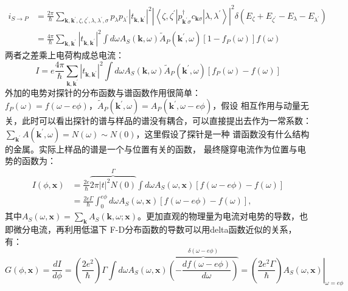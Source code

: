 \documentclass[10pt,openany]{book}
\theoremstyle{thmstyle} %
\theoremstyle{defstyle} %
\theoremstyle{prostyle} %
\begin{document}
\begin{equation}
	\begin{aligned}
		i_{S \rightarrow P} & =\frac{2 \pi}{\hbar} \sum_{\mathbf{k}, \mathbf{k}^{\prime}, \zeta, \zeta^{\prime}, \lambda, \lambda^{\prime}, \sigma} p_\lambda p_{\lambda^{\prime}}\left|t_{\mathbf{k}, \mathbf{k}^{\prime}}\right|^2\left|\left\langle\zeta, \zeta^{\prime}\left|p_{\mathbf{k}^{\prime} \sigma}^{\dagger} c_{\mathbf{k} \sigma}\right| \lambda, \lambda^{\prime}\right\rangle\right|^2 \delta\left(E_\zeta+E_{\zeta^{\prime}}-E_\lambda-E_{\lambda^{\prime}}\right) \\
		& =\frac{4 \pi}{\hbar} \sum_{\mathbf{k}, \mathbf{k}^{\prime}}\left|t_{\mathbf{k}, \mathbf{k}^{\prime}}\right|^2 \int d \omega A_S(\mathbf{k}, \omega) \tilde{A}_P\left(\mathbf{k}^{\prime}, \omega\right)\left[1-f_P(\omega)\right] f(\omega)
		\end{aligned}
\end{equation}
两者之差乘上电荷构成总电流：
\begin{equation}
	I=e \frac{4 \pi}{\hbar} \sum_{\mathbf{k}, \mathbf{k}^{\prime}}\left|t_{\mathbf{k}, \mathbf{k}^{\prime}}\right|^2 \int d \omega A_S(\mathbf{k}, \omega) \tilde{A}_P\left(\mathbf{k}^{\prime}, \omega\right)\left[f_P(\omega)-f(\omega)\right]
\end{equation}
外加的电势对探针的分布函数与谱函数作用很简单：$ f_P(\omega)=f(\omega-e \phi)，\tilde{A}_P\left(\mathbf{k}^{\prime}, \omega\right)=A_P\left(\mathbf{k}^{\prime}, \omega-e \phi\right) $，假设
相互作用与动量无关，此时可以看出探针的谱与样品的谱没有耦合，可以直接提出去作为一常系数：$ \sum_{\mathbf{k}^{\prime}} A\left(\mathbf{k}^{\prime}, \omega\right)=N(\omega)\sim N(0) $，这里假设了探针是一种
谱函数没有什么结构的金属。实际上样品的谱是一个与位置有关的函数，
最终隧穿电流作为位置与电势的函数为： 
\begin{equation}
	\begin{aligned}
		I(\phi, \mathbf{x}) & =\frac{2 e}{\hbar} \overbrace{2 \pi|t|^2 N(0)}^{\Gamma} \int d \omega A_S(\omega, \mathbf{x})[f(\omega-e \phi)-f(\omega)] \\
		& =\frac{2 e \Gamma}{\hbar} \int_0^{e \phi} d \omega A_S(\omega, \mathbf{x})[f(\omega-e \phi)-f(\omega)],
		\end{aligned}
\end{equation} 
其中$ A_S(\omega, \mathbf{x})=\sum_{\mathbf{k}} A_S(\mathbf{k}, \omega ; \mathbf{x}) $。更加直观的物理量为电流对电势的导数，也即微分电流，再利用低温下
F-D分布函数的导数可以用delta函数近似的关系，有：
\begin{equation}
	G(\phi, \mathbf{x})=\frac{d I}{d \phi}=\left(\frac{2 e^2}{\hbar}\right) \Gamma \int d \omega A_S(\omega, \mathbf{x}) \overbrace{\left(-\frac{d f(\omega-e \phi)}{d \omega}\right)}^{\delta(\omega-e \phi)}=\left.\left(\frac{2 e^2 \Gamma}{\hbar}\right) A_S(\omega, \mathbf{x})\right|_{\omega=e \phi}
\end{equation}
\end{document}
